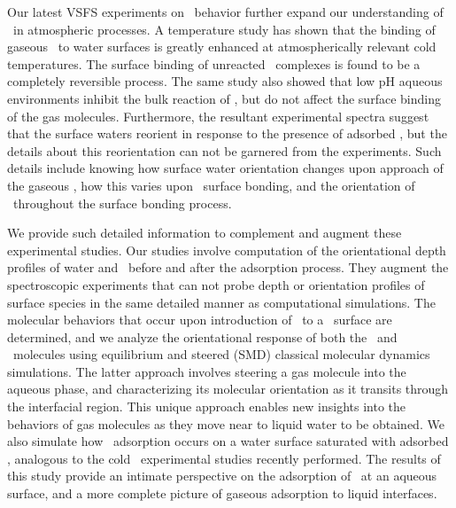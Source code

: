 Our latest VSFS experiments on \suldiox~behavior further expand our understanding of \suldiox~in atmospheric processes.\cite{Ota2011} A temperature study has shown that the binding of gaseous \suldiox~to water surfaces is greatly enhanced at atmospherically relevant cold temperatures. The surface binding of unreacted \suldiox~complexes is found to be a completely reversible process. The same study also showed that low pH aqueous environments inhibit the bulk reaction of \suldiox, but do not affect the surface binding of the gas molecules. Furthermore, the resultant experimental spectra suggest that the surface waters reorient in response to the presence of adsorbed \suldiox, but the details about this reorientation can not be garnered from the experiments.  Such details include knowing how surface water orientation changes upon approach of the gaseous \suldiox, how this varies upon \suldiox~surface bonding, and the orientation of \suldiox~throughout the surface bonding process. 

We provide such detailed information to complement and augment these experimental studies. Our studies involve computation of the orientational depth profiles of water and \suldiox~before and after the adsorption process. They augment the spectroscopic experiments that can not probe depth or orientation profiles of surface species in the same detailed manner as computational simulations. The molecular behaviors that occur upon introduction of \suldiox~to a \wat~surface are determined, and we analyze the orientational response of both the \suldiox~and \wat~molecules using equilibrium and steered (SMD) classical molecular dynamics simulations. The latter approach involves steering a gas molecule into the aqueous phase, and characterizing its molecular orientation as it transits through the interfacial region.  This unique approach enables new insights into the behaviors of gas molecules as they move near to liquid water to be obtained. We also simulate how \suldiox~adsorption occurs on a water surface saturated with adsorbed \suldiox, analogous to the cold \suldiox~experimental studies recently performed.\cite{Ota2011} The results of this study provide an intimate perspective on the adsorption of \suldiox~at an aqueous surface, and a more complete picture of gaseous adsorption to liquid interfaces.
